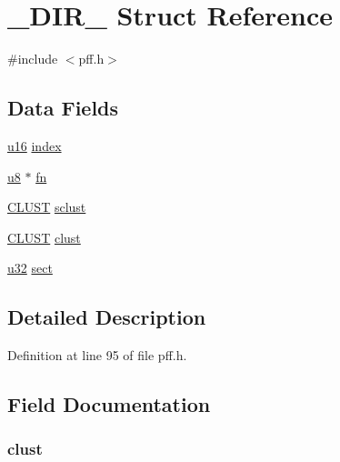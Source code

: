 \hypertarget{struct___d_i_r__}{\section{\-\_\-\-D\-I\-R\-\_\- Struct Reference}
\label{struct___d_i_r__}
}


{\ttfamily \#include $<$pff.\-h$>$}

\subsection*{Data Fields}
\begin{DoxyCompactItemize}
\item 
\hyperlink{p8_2pinguino_2core_2typedef_8h_a50b0d1c7a54fa09a64a3ac111c778520}{u16} \hyperlink{struct___d_i_r___aceac89c5a3f513fbaf0d24a293ccb75c}{index}
\item 
\hyperlink{p8_2pinguino_2core_2typedef_8h_aed742c436da53c1080638ce6ef7d13de}{u8} $\ast$ \hyperlink{struct___d_i_r___a4d44c37d88411bd5e8b490d823bb7f41}{fn}
\item 
\hyperlink{tff_8h_af322b62389c843d5727de4796a09f59c}{C\-L\-U\-S\-T} \hyperlink{struct___d_i_r___aada1acd6ce100ead798e712b18c49547}{sclust}
\item 
\hyperlink{tff_8h_af322b62389c843d5727de4796a09f59c}{C\-L\-U\-S\-T} \hyperlink{struct___d_i_r___aad779eab97ffc889755c8b483fbf9eb5}{clust}
\item 
\hyperlink{p8_2pinguino_2core_2typedef_8h_a2caf5cd7bcdbe1eefa727f44ffb10bac}{u32} \hyperlink{struct___d_i_r___a516c42b11207c2945dbf307809554d62}{sect}
\end{DoxyCompactItemize}


\subsection{Detailed Description}


Definition at line 95 of file pff.\-h.



\subsection{Field Documentation}
\hypertarget{struct___d_i_r___aad779eab97ffc889755c8b483fbf9eb5}{
\subsubsection[{clust}]{ clust}}\label{struct___d_i_r___aad779eab97ffc889755c8b483fbf9eb5}


